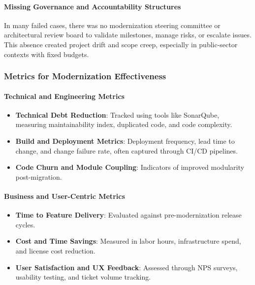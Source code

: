 \documentclass[12pt]{article}
\begin{document}
\paragraph{Missing Governance and Accountability Structures}

In many failed cases, there was no modernization steering committee or architectural review board to validate milestones, manage risks, or escalate issues. This absence created project drift and scope creep, especially in public-sector contexts with fixed budgets.

\vspace{0.5cm}
\subsubsection{Metrics for Modernization Effectiveness}

\paragraph{Technical and Engineering Metrics}

\begin{itemize}
    \item \textbf{Technical Debt Reduction}: Tracked using tools like SonarQube, measuring maintainability index, duplicated code, and code complexity.
    \item \textbf{Build and Deployment Metrics}: Deployment frequency, lead time to change, and change failure rate, often captured through CI/CD pipelines.
    \item \textbf{Code Churn and Module Coupling}: Indicators of improved modularity post-migration.
\end{itemize}

\paragraph{Business and User-Centric Metrics}

\begin{itemize}
    \item \textbf{Time to Feature Delivery}: Evaluated against pre-modernization release cycles.
    \item \textbf{Cost and Time Savings}: Measured in labor hours, infrastructure spend, and license cost reduction.
    \item \textbf{User Satisfaction and UX Feedback}: Assessed through NPS surveys, usability testing, and ticket volume tracking.
\end{itemize}
\end{document}

